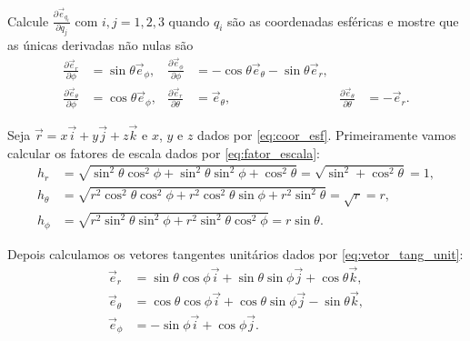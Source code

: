 \documentclass[a4paper,12pt, leqno, answers]{exam}
\newcommand{\devp}[2]{\frac{\partial #1}{\partial #2}}
\begin{document}
\begin{questions}
    \question Calcule $\devp{\vec{e}_{q_i}}{q_j}$ com $i, j = 1, 2, 3$ quando $q_i$ s\~{a}o as coordenadas esf\'{e}ricas e mostre que as únicas derivadas n\~{a}o nulas s\~{a}o
    \begin{align*}
        \devp{\vec{e}_r}{\phi} &= \sin \theta \vec{e}_\phi, &
        \devp{\vec{e}_\phi}{\phi} &= -\cos \theta \vec{e}_\theta - \sin \theta \vec{e}_r, \\
        \devp{\vec{e}_\theta}{\phi} &= \cos \theta \vec{e}_\phi, &
        \devp{\vec{e}_r}{\theta} &= \vec{e}_\theta, &
        \devp{\vec{e}_\theta}{\theta} &= -\vec{e}_r.
    \end{align*}
    \begin{solution}
        Seja $\vec{r} = x \vec{i} + y \vec{j} + z \vec{k}$ e $x$, $y$ e $z$ dados por \eqref{eq:coor_esf}. Primeiramente vamos calcular os fatores de escala dados por \eqref{eq:fator_escala}:
        \begin{align*}
            h_r &= \sqrt{\sin^2 \theta \cos^2 \phi + \sin^2 \theta \sin^2 \phi + \cos^2 \theta} = \sqrt{\sin^2  + \cos^2 \theta} = 1, \\
            h_\theta &= \sqrt{r^2 \cos^2 \theta \cos^2 \phi + r^2 \cos^2 \theta \sin \phi + r^2 \sin^2 \theta} = \sqrt{r} = r, \\
            h_\phi &= \sqrt{r^2 \sin^2 \theta \sin^2 \phi + r^2 \sin^2 \theta \cos^2 \phi} = r \sin \theta.
        \end{align*}
  
        Depois calculamos os vetores tangentes unit\'{a}rios dados por \eqref{eq:vetor_tang_unit}:
        \begin{align*}
            \vec{e}_r &= \sin \theta \cos \phi \vec{i} + \sin \theta \sin \phi \vec{j} + \cos \theta \vec{k}, \\
            \vec{e}_\theta &= \cos \theta \cos \phi \vec{i} + \cos \theta \sin \phi \vec{j} - \sin \theta \vec{k}, \\
            \vec{e}_\phi &= - \sin \phi \vec{i} + \cos \phi \vec{j}.
        \end{align*}
  

\end{solution}
\end{questions}
\end{document}
